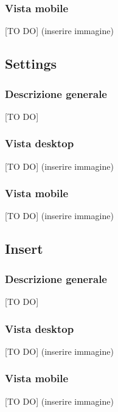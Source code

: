 		\subsubsection{Vista mobile} %
		[TO DO] (inserire immagine)

	\subsection{Settings} %
	\label{sub:settings}
		\subsubsection{Descrizione generale} %
		[TO DO]

		\subsubsection{Vista desktop} %
		[TO DO] (inserire immagine)

		\subsubsection{Vista mobile} %
		[TO DO] (inserire immagine)

	\subsection{Insert} %
	\label{sub:insert}
		\subsubsection{Descrizione generale} %
		[TO DO]

		\subsubsection{Vista desktop} %
		[TO DO] (inserire immagine)

		\subsubsection{Vista mobile} %
		[TO DO] (inserire immagine)







